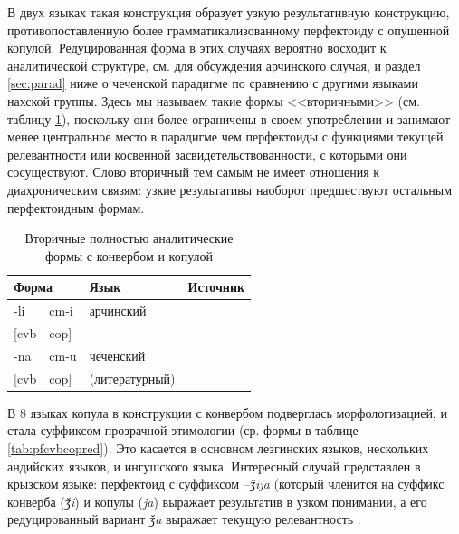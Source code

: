 В двух языках такая конструкция образует узкую результативную конструкцию, противопоставленную более грамматикализованному перфектоиду с опущенной копулой. Редуцированная форма в этих случаях вероятно восходит к аналитической структуре, см. \citep{tatevosov2001} для обсуждения арчинского случая, и раздел \ref{sec:parad} ниже о чеченской парадигме по сравнению с другими языками нахской группы. Здесь мы называем такие формы <<вторичными>> (см. таблицу \ref{tab:pfcvbcopsec}), поскольку они более ограничены в своем употреблении и занимают менее центральное место в парадигме чем перфектоиды с функциями текущей релевантности или косвенной засвидетельствованности, с которыми они сосуществуют. Слово вторичный тем самым не имеет отношения к диахроническим связям: узкие результативы наоборот предшествуют остальным перфектоидным формам.

\begin{table}[ht]
\caption{Вторичные полностью аналитические формы с конвербом и копулой}
\label{tab:pfcvbcopsec}
\vspace{0.2cm}
\begin{center}
\begin{tabular}{ll|ll}
\multicolumn{2}{l|}{Форма} & Язык      & Источник        \\ \hline
-li 	&	cm-i 	&	арчинский	&	\citep{tatevosov2001}	\\
{[}cvb	&	cop{]}	&		&		\\
-na 	&	cm-u 	&	чеченский	&	\citep{molochieva2010}	\\
{[}cvb	&	cop{]}	&	(литературный)	&		\\
\end{tabular}
\end{center}
\end{table}

В 8 языках копула в конструкции с конвербом подверглась морфологизацией, и стала суффиксом прозрачной этимологии (ср. формы в таблице \ref{tab:pfcvbcopred}). Это касается в основном лезгинских языков, нескольких андийских языков, и ингушского языка. Интересный случай представлен в крызском языке: перфектоид с суффиксом \textit{–ǯija} (который членится на суффикс конверба (\textit{ǯi}) и копулы (\textit{ja}) выражает результатив в узком понимании, а его редуцированный вариант \textit{ǯa} выражает текущую релевантность \citep[19]{maisaklezgpf}. 

